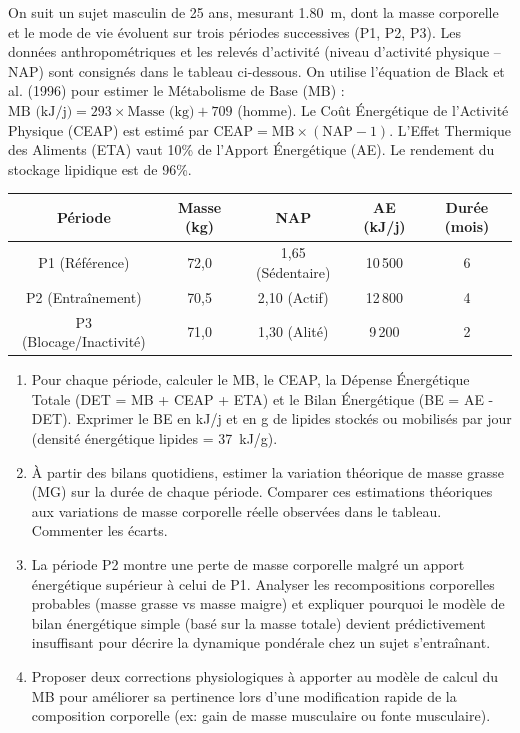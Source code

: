 \documentclass[11pt]{article}
\begin{document}
\begin{exercice}
On suit un sujet masculin de 25 ans, mesurant \SI{1,80}{m}, dont la masse corporelle et le mode de vie évoluent sur trois périodes successives (P1, P2, P3). Les données anthropométriques et les relevés d'activité (niveau d'activité physique -- NAP) sont consignés dans le tableau ci-dessous. On utilise l'équation de Black et al. (1996) pour estimer le Métabolisme de Base (MB) : $\text{MB (kJ/j)} = 293 \times \text{Masse (kg)} + 709$ (homme). Le Coût Énergétique de l'Activité Physique (CEAP) est estimé par $\text{CEAP} = \text{MB} \times (\text{NAP} - 1)$. L'Effet Thermique des Aliments (ETA) vaut 10\% de l'Apport Énergétique (AE). Le rendement du stockage lipidique est de 96\%.

\begin{center}
\begin{tabular}{|c|c|c|c|c|}
\hline
\textbf{Période} & \textbf{Masse (kg)} & \textbf{NAP} & \textbf{AE (kJ/j)} & \textbf{Durée (mois)} \\
\hline
P1 (Référence) & 72,0 & 1,65 (Sédentaire) & 10\,500 & 6 \\
\hline
P2 (Entraînement) & 70,5 & 2,10 (Actif) & 12\,800 & 4 \\
\hline
P3 (Blocage/Inactivité) & 71,0 & 1,30 (Alité) & 9\,200 & 2 \\
\hline
\end{tabular}
\end{center}

\begin{enumerate}
    \item Pour chaque période, calculer le MB, le CEAP, la Dépense Énergétique Totale (DET = MB + CEAP + ETA) et le Bilan Énergétique (BE = AE - DET). Exprimer le BE en kJ/j et en g de lipides stockés ou mobilisés par jour (densité énergétique lipides = \SI{37}{kJ/g}).
    \item À partir des bilans quotidiens, estimer la variation théorique de masse grasse (MG) sur la durée de chaque période. Comparer ces estimations théoriques aux variations de masse corporelle réelle observées dans le tableau. Commenter les écarts.
    \item La période P2 montre une perte de masse corporelle malgré un apport énergétique supérieur à celui de P1. Analyser les recompositions corporelles probables (masse grasse vs masse maigre) et expliquer pourquoi le modèle de bilan énergétique simple (basé sur la masse totale) devient prédictivement insuffisant pour décrire la dynamique pondérale chez un sujet s'entraînant.
    \item Proposer deux corrections physiologiques à apporter au modèle de calcul du MB pour améliorer sa pertinence lors d'une modification rapide de la composition corporelle (ex: gain de masse musculaire ou fonte musculaire).
\end{enumerate}
\end{exercice}
\end{document}
